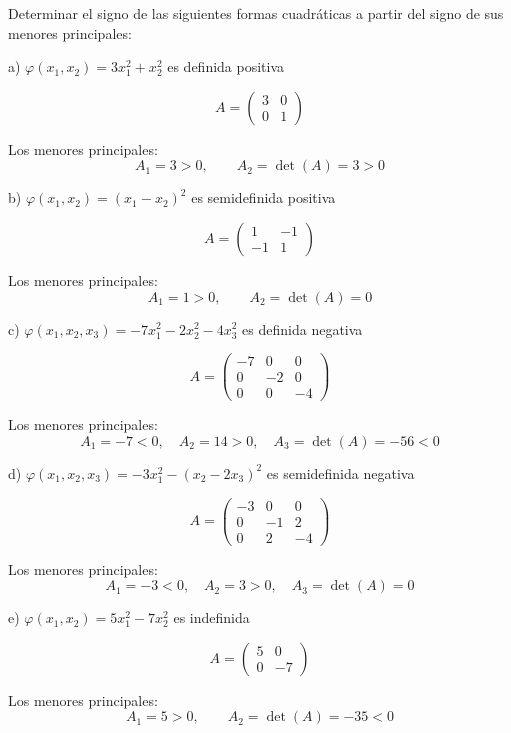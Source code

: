 \begin{Ejer}
Determinar el signo de las siguientes formas cuadráticas a partir del signo de sus menores principales:

a) $\varphi(x_1,x_2)=3x_1^2+x_2^2$ es definida positiva

\[
A=
\begin{pmatrix}
3 & 0\\
0 & 1
\end{pmatrix}
\]

Los menores principales:
\[
A_1=3>0,\qquad
A_2=\det(A)=3>0
\]

b) $\varphi(x_1,x_2)=(x_1-x_2)^2$ es semidefinida positiva

\[
A=
\begin{pmatrix}
1 & -1\\
-1 & 1
\end{pmatrix}
\]

Los menores principales:
\[
A_1=1>0,\qquad
A_2=\det(A)=0
\]

c) $\varphi(x_1,x_2,x_3)=-7x_1^2-2x_2^2-4x_3^2$ es definida negativa

\[
A=
\begin{pmatrix}
-7 & 0 & 0\\
0 & -2 & 0\\
0 & 0 & -4
\end{pmatrix}
\]

Los menores principales:
\[
A_1=-7<0,\quad
A_2=14>0,\quad
A_3=\det(A)=-56<0
\]

d) $\varphi(x_1,x_2,x_3)=-3x_1^2-(x_2-2x_3)^2$ es semidefinida negativa

\[
A=
\begin{pmatrix}
-3 & 0 & 0\\
0 & -1 & 2\\
0 & 2 & -4
\end{pmatrix}
\]

Los menores principales:
\[
A_1=-3<0,\quad
A_2=3>0,\quad
A_3=\det(A)=0
\]

e) $\varphi(x_1,x_2)=5x_1^2-7x_2^2$ es indefinida

\[
A=
\begin{pmatrix}
5 & 0\\
0 & -7
\end{pmatrix}
\]

Los menores principales:
\[
A_1=5>0,\qquad
A_2=\det(A)=-35<0
\]
\end{Ejer}

